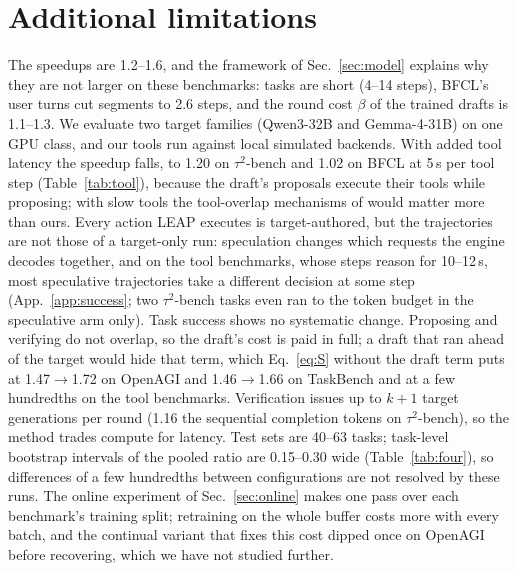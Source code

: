 \section{Additional limitations}
\label{app:limitations}
The speedups are 1.2--1.6\xx{}, and the framework of Sec.~\ref{sec:model} explains why they are not larger on
these benchmarks: tasks are short (4--14 steps), BFCL's user turns cut segments to 2.6 steps, and the
round cost $\beta$ of the trained drafts is 1.1--1.3. We evaluate two
target families (Qwen3-32B and Gemma-4-31B) on one GPU class, and our tools run against local simulated backends. With added tool latency the speedup
falls, to 1.20\xx{} on $\tau^2$-bench and 1.02\xx{} on BFCL at 5\,s per tool step (Table~\ref{tab:tool}), because the
draft's proposals execute their tools while proposing; with slow tools the tool-overlap
mechanisms of \citet{stc,swm,aospec} would matter more than ours. Every action LEAP executes is
target-authored, but the trajectories are not those of a target-only run: speculation changes which requests the
engine decodes together, and on the tool benchmarks, whose steps reason for 10--12\,s, most speculative
trajectories take a different decision at some step (App.~\ref{app:success}; two $\tau^2$-bench tasks even ran to
the token budget in the speculative arm only). Task success shows no systematic change. Proposing and verifying do not overlap, so the draft's cost is paid in full; a draft that ran ahead of the
target would hide that term, which Eq.~\ref{eq:S} without the draft term puts at 1.47$\to$1.72\xx{} on OpenAGI
and 1.46$\to$1.66\xx{} on TaskBench and at a few hundredths on the tool benchmarks. Verification issues up to
$k{+}1$ target generations per round (1.16\xx{} the sequential completion tokens on $\tau^2$-bench), so the
method trades compute for latency. Test sets are 40--63 tasks; task-level bootstrap intervals of the pooled
ratio are 0.15--0.30 wide (Table~\ref{tab:four}), so differences of a few
hundredths between configurations are not resolved by these runs. The online experiment of
Sec.~\ref{sec:online} makes one pass over each benchmark's training split; retraining on the whole buffer
costs more with every batch, and the continual variant that fixes this cost dipped once on OpenAGI before recovering,
which we have not studied further.
